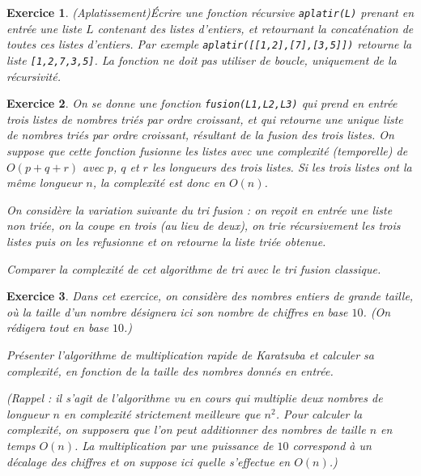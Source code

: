 \documentclass[11pt,a4paper]{article}
\newtheorem{ex}{Exercice}
\begin{document}
\begin{ex}(Aplatissement)\label{flatten}
Écrire une fonction récursive \verb+aplatir(L)+ prenant en entrée une liste $L$ contenant des listes d'entiers, et retournant la concaténation de toutes ces listes d'entiers. Par exemple \verb+aplatir([[1,2],[7],[3,5]])+ retourne la liste \verb+[1,2,7,3,5]+.
La fonction ne doit pas utiliser de boucle, uniquement de la récursivité.
\end{ex}




\begin{ex}\label{fusion}
On se donne une fonction \verb+fusion(L1,L2,L3)+ qui prend en entrée trois listes de nombres triés par ordre croissant, et qui retourne une unique liste de nombres triés par ordre croissant, résultant de la fusion des trois listes. On suppose que cette fonction fusionne les listes avec une complexité (temporelle) de $O(p+q+r)$ avec $p$, $q$ et $r$ les longueurs des trois listes. Si les trois listes ont la même longueur $n$, la complexité est donc en $O(n)$.

On considère la variation suivante du tri fusion : on reçoit en entrée une liste non triée, on la coupe en trois (au lieu de deux), on trie récursivement les trois listes puis on les refusionne et on retourne la liste triée obtenue.

Comparer la complexité de cet algorithme de tri avec le tri fusion classique.

\end{ex}

\begin{ex}\label{Karatsuba}
Dans cet exercice, on considère des nombres entiers de grande taille, où la taille d'un nombre désignera ici son nombre de chiffres en base $10$. (On rédigera tout en base $10$.)

Présenter l'algorithme de multiplication rapide de Karatsuba et calculer sa complexité, en fonction de la taille des nombres donnés en entrée. 


(Rappel : il s'agit de l'algorithme vu en cours qui multiplie deux nombres de longueur $n$ en complexité strictement meilleure que $n^2$. Pour calculer la complexité, on supposera que l'on peut additionner des nombres de taille $n$ en temps $O(n)$. La multiplication par une puissance de $10$ correspond à un décalage des chiffres et on suppose ici quelle s'effectue en $O(n)$.)
\end{ex}
\end{document}
